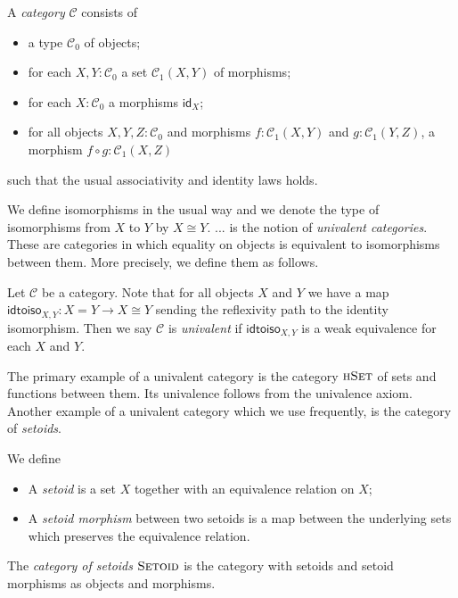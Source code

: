 \documentclass[9pt]{entcs}
\newcommand{\type}[1]{\textsc{#1}}
\newcommand{\category}[1]{\textsc{#1}}
\newcommand{\function}[1]{\mathsf{#1}}
\newcommand{\morphism}[1]{\mathsf{#1}}
\newcommand{\hset}{\type{hSet}} %
\newcommand{\0}{\textbf{0}} %
\newcommand{\1}{\textbf{1}} %
\newcommand{\idm}[1]{\morphism{id}_{#1}} %
\newcommand{\compm}[2]{#1 \circ #2} %
\newcommand{\iso}[2]{#1 \cong #2} %
\newcommand{\setoids}{\category{Setoid}} %
\newcommand{\idtoiso}{\function{idtoiso}} %
\begin{document}
\begin{definition}
\label{def:cat}
A \emph{category} $\mathcal{C}$ consists of
\begin{itemize}
	\item a type $\mathcal{C}_0$ of objects;
	\item for each $X, Y : \mathcal{C}_0$ a set $\mathcal{C}_1(X,Y)$ of morphisms;
	\item for each $X : \mathcal{C}_0$ a morphisms $\idm{X}$;
	\item for all objects $X, Y, Z : \mathcal{C}_0$ and morphisms $f : \mathcal{C}_1(X,Y)$ and $g : \mathcal{C}_1(Y,Z)$, a morphism $\compm{f}{g} : \mathcal{C}_1(X,Z)$
\end{itemize}
such that the usual associativity and identity laws holds.
\end{definition}

We define isomorphisms in the usual way and we denote the type of isomorphisms from $X$ to $Y$ by $\iso{X}{Y}$.
... is the notion of \emph{univalent categories}.
These are categories in which equality on objects is equivalent to isomorphisms between them.
More precisely, we define them as follows.

\begin{definition}
\label{def:univalent}
Let $\mathcal{C}$ be a category.
Note that for all objects $X$ and $Y$ we have a map $\idtoiso_{X,Y} : X = Y \rightarrow \iso{X}{Y}$ sending the reflexivity path to the identity isomorphism.
Then we say $\mathcal{C}$ is \emph{univalent} if $\idtoiso_{X,Y}$ is a weak equivalence for each $X$ and $Y$.
\end{definition}

The primary example of a univalent category is the category $\hset$ of sets and functions between them.
Its univalence follows from the univalence axiom.
Another example of a univalent category which we use frequently, is the category of \emph{setoids}.

\begin{definition}
\label{def:setoid}
We define
\begin{itemize}
	\item A \emph{setoid} is a set $X$ together with an equivalence relation on $X$;
	\item A \emph{setoid morphism} between two setoids  is a map between the underlying sets which preserves the equivalence relation.
\end{itemize}
The \emph{category of setoids} $\setoids$ is the category with setoids and setoid morphisms as objects and morphisms.
\end{definition}
\end{document}
